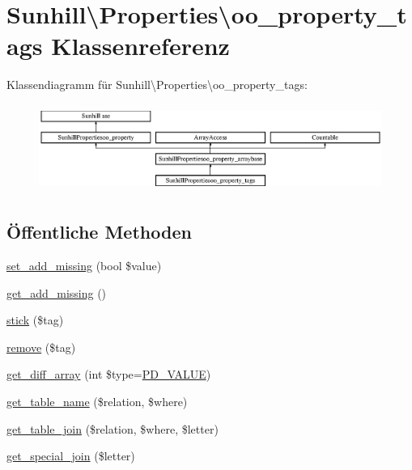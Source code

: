 \hypertarget{classSunhill_1_1Properties_1_1oo__property__tags}{}\section{Sunhill\textbackslash{}Properties\textbackslash{}oo\+\_\+property\+\_\+tags Klassenreferenz}
\label{classSunhill_1_1Properties_1_1oo__property__tags}
Klassendiagramm für Sunhill\textbackslash{}Properties\textbackslash{}oo\+\_\+property\+\_\+tags\+:\begin{figure}[H]
\begin{center}
\leavevmode
\includegraphics[height=2.894057cm]{dd/dd8/classSunhill_1_1Properties_1_1oo__property__tags}
\end{center}
\end{figure}
\subsection*{Öffentliche Methoden}
\begin{DoxyCompactItemize}
\item 
\hyperlink{classSunhill_1_1Properties_1_1oo__property__tags_a101b55f83587b8882b05119c88fe1131}{set\+\_\+add\+\_\+missing} (bool \$value)
\item 
\hyperlink{classSunhill_1_1Properties_1_1oo__property__tags_a51c623a972ff9414b43c8c115cc0271a}{get\+\_\+add\+\_\+missing} ()
\item 
\hyperlink{classSunhill_1_1Properties_1_1oo__property__tags_aee694204c0b94ca849b36aeb2eb5cceb}{stick} (\$tag)
\item 
\hyperlink{classSunhill_1_1Properties_1_1oo__property__tags_a98d873cb30682e4b98f83f3f53792fcb}{remove} (\$tag)
\item 
\hyperlink{classSunhill_1_1Properties_1_1oo__property__tags_aff7d75ac62d867fdecc0413e23c53e04}{get\+\_\+diff\+\_\+array} (int \$type=\hyperlink{namespaceSunhill_1_1Properties_a28c3de9e20fd246123a2853f7055117d}{P\+D\+\_\+\+V\+A\+L\+UE})
\item 
\hyperlink{classSunhill_1_1Properties_1_1oo__property__tags_ae18a567b7aa4729693de9916d910c6a9}{get\+\_\+table\+\_\+name} (\$relation, \$where)
\item 
\hyperlink{classSunhill_1_1Properties_1_1oo__property__tags_a067d658b6beafa402ea931f7da6e34a6}{get\+\_\+table\+\_\+join} (\$relation, \$where, \$letter)
\item 
\hyperlink{classSunhill_1_1Properties_1_1oo__property__tags_a50bf83c682028301b5ba479963f41d82}{get\+\_\+special\+\_\+join} (\$letter)
\end{DoxyCompactItemize}

